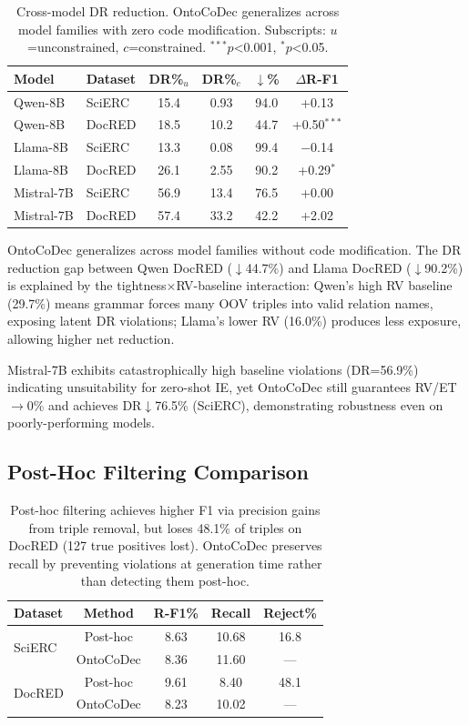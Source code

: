 \documentclass[11pt]{article}
\begin{document}
\begin{table}[t]
\centering
\small
\begin{tabular}{llcccc}
\toprule
\textbf{Model} & \textbf{Dataset} & \textbf{DR\%$_u$} & \textbf{DR\%$_c$} & \textbf{$\downarrow$\%} & \textbf{$\Delta$R-F1} \\
\midrule
Qwen-8B & SciERC & 15.4 & 0.93 & 94.0 & +0.13 \\
Qwen-8B & DocRED & 18.5 & 10.2 & 44.7 & +0.50$^{***}$ \\
Llama-8B & SciERC & 13.3 & 0.08 & 99.4 & $-$0.14 \\
Llama-8B & DocRED & 26.1 & 2.55 & 90.2 & +0.29$^{*}$ \\
Mistral-7B & SciERC & 56.9 & 13.4 & 76.5 & +0.00 \\
Mistral-7B & DocRED & 57.4 & 33.2 & 42.2 & +2.02 \\
\bottomrule
\end{tabular}
\caption{Cross-model DR reduction. OntoCoDec generalizes across model families with zero code modification. Subscripts: $u$=unconstrained, $c$=constrained. $^{***}p$<0.001, $^*p$<0.05.}
\label{tab:cross}
\end{table}

OntoCoDec generalizes across model families without code modification. The DR reduction gap between Qwen DocRED ($\downarrow$44.7\%) and Llama DocRED ($\downarrow$90.2\%) is explained by the tightness$\times$RV-baseline interaction: Qwen's high RV baseline (29.7\%) means grammar forces many OOV triples into valid relation names, exposing latent DR violations; Llama's lower RV (16.0\%) produces less exposure, allowing higher net reduction.

Mistral-7B exhibits catastrophically high baseline violations (DR=56.9\%) indicating unsuitability for zero-shot IE, yet OntoCoDec still guarantees RV/ET$\to$0\% and achieves DR$\downarrow$76.5\% (SciERC), demonstrating robustness even on poorly-performing models.

\subsection{Post-Hoc Filtering Comparison}
\label{sec:posthoc}

\begin{table}[t]
\centering
\small
\begin{tabular}{lcccc}
\toprule
\textbf{Dataset} & \textbf{Method} & \textbf{R-F1\%} & \textbf{Recall} & \textbf{Reject\%} \\
\midrule
\multirow{2}{*}{SciERC} & Post-hoc & 8.63 & 10.68 & 16.8 \\
 & OntoCoDec & 8.36 & 11.60 & --- \\
\midrule
\multirow{2}{*}{DocRED} & Post-hoc & 9.61 & 8.40 & 48.1 \\
 & OntoCoDec & 8.23 & 10.02 & --- \\
\bottomrule
\end{tabular}
\caption{Post-hoc filtering achieves higher F1 via precision gains from triple removal, but loses 48.1\% of triples on DocRED (127 true positives lost). OntoCoDec preserves recall by preventing violations at generation time rather than detecting them post-hoc.}
\label{tab:posthoc}
\end{table}
\end{document}
